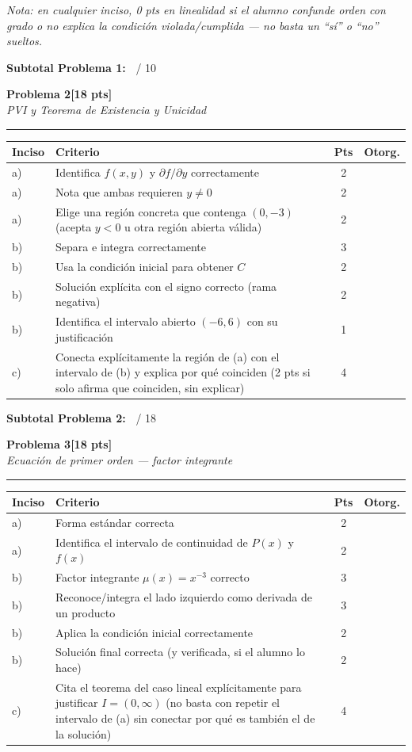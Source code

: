 \documentclass[11pt,letterpaper]{article}
\makeatletter
\newcommand{\problema}[3]{%
  \bigskip\bigskip\noindent
  {\Large\textbf{Problema #1}}\hfill\textbf{[#2 pts]}\\[3pt]
  {\small\itshape #3}\par
  \vspace{2pt}\hrule\vspace{8pt}
}
\newenvironment{tablarubrica}{%
  \begin{tabular}{@{}p{1.1cm}Lcc@{}}
  \toprule
  \textbf{Inciso} & \textbf{Criterio} & \textbf{Pts} & \textbf{Otorg.} \\
  \midrule
}{%
  \bottomrule
  \end{tabular}
}
\makeatother
\begin{document}
\textit{Nota: en cualquier inciso, 0 pts en linealidad si el alumno confunde orden con grado o no explica la condición violada/cumplida — no basta un ``sí'' o ``no'' sueltos.}

\medskip
\noindent\textbf{Subtotal Problema 1:\ } \underline{\hspace{2.5cm}} / 10

\newpage
\problema{2}{18}{PVI y Teorema de Existencia y Unicidad}

\begin{tablarubrica}
a) & Identifica $f(x,y)$ y $\partial f/\partial y$ correctamente & 2 & \\
a) & Nota que ambas requieren $y\neq0$ & 2 & \\
a) & Elige una región concreta que contenga $(0,-3)$ (acepta $y<0$ u otra región abierta válida) & 2 & \\
b) & Separa e integra correctamente & 3 & \\
b) & Usa la condición inicial para obtener $C$ & 2 & \\
b) & Solución explícita con el signo correcto (rama negativa) & 2 & \\
b) & Identifica el intervalo abierto $(-6,6)$ con su justificación & 1 & \\
c) & Conecta explícitamente la región de (a) con el intervalo de (b) y explica por qué coinciden (2 pts si solo afirma que coinciden, sin explicar) & 4 & \\
\end{tablarubrica}

\medskip
\noindent\textbf{Subtotal Problema 2:\ } \underline{\hspace{2.5cm}} / 18

\problema{3}{18}{Ecuación de primer orden --- factor integrante}

\begin{tablarubrica}
a) & Forma estándar correcta & 2 & \\
a) & Identifica el intervalo de continuidad de $P(x)$ y $f(x)$ & 2 & \\
b) & Factor integrante $\mu(x)=x^{-3}$ correcto & 3 & \\
b) & Reconoce/integra el lado izquierdo como derivada de un producto & 3 & \\
b) & Aplica la condición inicial correctamente & 2 & \\
b) & Solución final correcta (y verificada, si el alumno lo hace) & 2 & \\
c) & Cita el teorema del caso lineal explícitamente para justificar $I=(0,\infty)$ (no basta con repetir el intervalo de (a) sin conectar por qué es también el de la solución) & 4 & \\
\end{tablarubrica}
\end{document}
